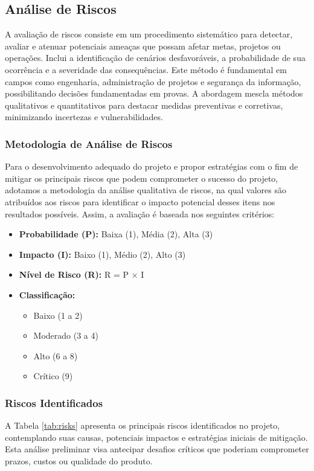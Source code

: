 \documentclass[a5paper, 12pt]{article}
\begin{document}
\subsection{Análise de Riscos}

A avaliação de riscos consiste em um procedimento sistemático para detectar, avaliar e atenuar potenciais ameaças que possam afetar metas, projetos ou operações. Inclui a identificação de cenários desfavoráveis, a probabilidade de sua ocorrência e a severidade das consequências. Este método é fundamental em campos como engenharia, administração de projetos e segurança da informação, possibilitando decisões fundamentadas em provas. A abordagem mescla métodos qualitativos e quantitativos para destacar medidas preventivas e corretivas, minimizando incertezas e vulnerabilidades.

\subsubsection{Metodologia de Análise de Riscos}

Para o desenvolvimento adequado do projeto e propor estratégias com o fim de mitigar os principais riscos que podem comprometer o sucesso do projeto, adotamos a metodologia da análise qualitativa de riscos, na qual valores são atribuídos aos riscos para identificar o impacto potencial desses itens nos resultados possíveis. Assim, a avaliação é baseada nos seguintes critérios:

\begin{itemize}
    \item \textbf{Probabilidade (P):} Baixa (1), Média (2), Alta (3)
    \item \textbf{Impacto (I):} Baixo (1), Médio (2), Alto (3)
    \item \textbf{Nível de Risco (R):} R = P × I
    \item \textbf{Classificação:}
    \begin{itemize}
        \item Baixo (1 a 2)
        \item Moderado (3 a 4)
        \item Alto (6 a 8)
        \item Crítico (9)
    \end{itemize}
\end{itemize}

\subsubsection{Riscos Identificados}
A Tabela \ref{tab:risks} apresenta os principais riscos identificados no projeto, contemplando suas causas, potenciais impactos e estratégias iniciais de mitigação. Esta análise preliminar visa antecipar desafios críticos que poderiam comprometer prazos, custos ou qualidade do produto. 
\end{document}
